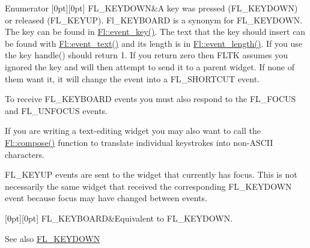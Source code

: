 \begin{DoxyEnumFields}{Enumerator}
[0pt][0pt]{}\mbox{\label{_enumerations_8_h_ad16daf120d9a0501cccaee563af0b9a3a1d132318f4c72305fd1babbbc4dbeb1a}} 
F\+L\+\_\+\+K\+E\+Y\+D\+O\+WN&A key was pressed (F\+L\+\_\+\+K\+E\+Y\+D\+O\+WN) or released (F\+L\+\_\+\+K\+E\+Y\+UP). Fl\+\_\+\+K\+E\+Y\+B\+O\+A\+RD is a synonym for F\+L\+\_\+\+K\+E\+Y\+D\+O\+WN. The key can be found in \hyperlink{group__fl__events_ga1ac131e3cd5ca674cc022b1f77233449}{Fl\+::event\+\_\+key()}. The text that the key should insert can be found with \hyperlink{group__fl__events_ga6647c55948fe1d8be9367267529e9c54}{Fl\+::event\+\_\+text()} and its length is in \hyperlink{group__fl__events_ga38f2de89fbdf59ad2cd4dca93f472911}{Fl\+::event\+\_\+length()}. If you use the key handle() should return 1. If you return zero then F\+L\+TK assumes you ignored the key and will then attempt to send it to a parent widget. If none of them want it, it will change the event into a F\+L\+\_\+\+S\+H\+O\+R\+T\+C\+UT event.

To receive F\+L\+\_\+\+K\+E\+Y\+B\+O\+A\+RD events you must also respond to the F\+L\+\_\+\+F\+O\+C\+US and F\+L\+\_\+\+U\+N\+F\+O\+C\+US events.

If you are writing a text-\/editing widget you may also want to call the \hyperlink{group__fl__events_ga2c16ab49eb753b98f3d8f1e96429d094}{Fl\+::compose()} function to translate individual keystrokes into non-\/\+A\+S\+C\+II characters.

F\+L\+\_\+\+K\+E\+Y\+UP events are sent to the widget that currently has focus. This is not necessarily the same widget that received the corresponding F\+L\+\_\+\+K\+E\+Y\+D\+O\+WN event because focus may have changed between events. \\
\hline

[0pt][0pt]{}\mbox{\label{_enumerations_8_h_ad16daf120d9a0501cccaee563af0b9a3a1387c0430ec873aa44704954a369143b}} 
F\+L\+\_\+\+K\+E\+Y\+B\+O\+A\+RD&Equivalent to F\+L\+\_\+\+K\+E\+Y\+D\+O\+WN. \begin{DoxySeeAlso}{See also}
\hyperlink{_enumerations_8_h_ad16daf120d9a0501cccaee563af0b9a3a1d132318f4c72305fd1babbbc4dbeb1a}{F\+L\+\_\+\+K\+E\+Y\+D\+O\+WN} 
\end{DoxySeeAlso}
\\
\hline


\end{DoxyEnumFields}
